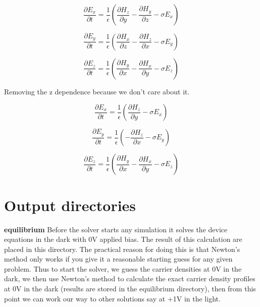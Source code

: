 \documentclass[11pt]{article}
\begin{document}
\begin{equation}
\frac{\partial E_x}{\partial t}= \frac{1}{\epsilon}(\frac{\partial H_z}{\partial y}-\frac{\partial H_y}{\partial z}-\sigma E_x) 
\end{equation}

\begin{equation}
\frac{\partial E_y}{\partial t}= \frac{1}{\epsilon}(\frac{\partial H_x}{\partial z}-\frac{\partial H_z}{\partial x}-\sigma E_y) 
\end{equation}

\begin{equation}
\frac{\partial E_z}{\partial t}= \frac{1}{\epsilon}(\frac{\partial H_y}{\partial x}-\frac{\partial H_x}{\partial y}-\sigma E_z) 
\end{equation}

Removing the z dependence because we don't care about it.

\begin{equation}
\frac{\partial E_x}{\partial t}= \frac{1}{\epsilon}(\frac{\partial H_z}{\partial y}-\sigma E_x) 
\end{equation}

\begin{equation}
\frac{\partial E_y}{\partial t}= \frac{1}{\epsilon}(-\frac{\partial H_z}{\partial x}-\sigma E_y) 
\end{equation}

\begin{equation}
\frac{\partial E_z}{\partial t}= \frac{1}{\epsilon}(\frac{\partial H_y}{\partial x}-\frac{\partial H_x}{\partial y}-\sigma E_z) 
\end{equation}


\section{Output directories}
\textbf{equilibrium}\newline
Before the solver starts any simulation it solves the device equations in the dark with 0V applied bias.  The result of this calculation are placed in this directory.  The practical reason for doing this is that Newton's method only works if you give it a reasonable starting guess for any given problem.  Thus to start the solver, we guess the carrier densities at 0V in the dark, we then use Newton's method to calculate the exact carrier density profiles at 0V in the dark (results are stored in the equilibrium directory), then from this point we can work our way to other solutions say at +1V in the light.\cite{0953-8984-25-21-215301}
\newline
\end{document}
